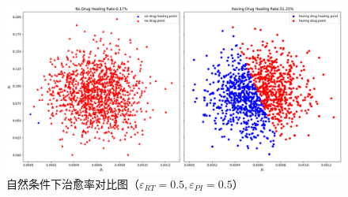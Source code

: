 \documentclass{ctexart}
\begin{document}
\begin{figure}[H]
    \centering
    \includegraphics[width=\linewidth]{6.2.2.png}
    \caption{自然条件下治愈率对比图（$\varepsilon _{RT}=0.5,\varepsilon _{PI}=0.5$）}
    \label{fig.6.2.2}
\end{figure}
\end{document}
